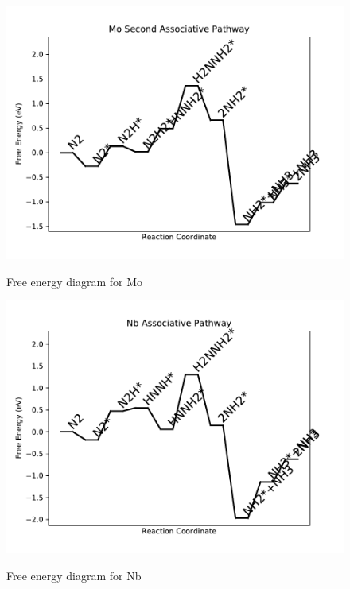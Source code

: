 \documentclass{article}
\begin{document}
\begin{figure}
\includegraphics[width=1\linewidth]{data/plots/Mo_associative_2.pdf}
\label{fig:Mo_associative_2}
\caption{Free energy diagram for Mo}
\end{figure}

\begin{figure}
\includegraphics[width=1\linewidth]{data/plots/Nb_associative.pdf}
\label{fig:Nb_associative}
\caption{Free energy diagram for Nb}
\end{figure}
\end{document}
